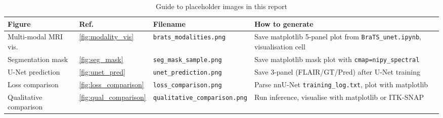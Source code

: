 \documentclass[12pt,a4paper]{report}
\begin{document}
\begin{table}[H]
\centering
\caption{Guide to placeholder images in this report}
\label{tab:image_guide}
\begin{tabular}{lllp{5cm}}
\toprule
\textbf{Figure} & \textbf{Ref.} & \textbf{Filename} & \textbf{How to generate} \\
\midrule
Multi-modal MRI vis. & \ref{fig:modality_vis} & \texttt{brats\_modalities.png} & Save matplotlib 5-panel plot from \texttt{BraTS\_unet.ipynb}, visualisation cell \\
Segmentation mask & \ref{fig:seg_mask} & \texttt{seg\_mask\_sample.png} & Save matplotlib mask plot with \texttt{cmap=nipy\_spectral} \\
U-Net prediction & \ref{fig:unet_pred} & \texttt{unet\_prediction.png} & Save 3-panel (FLAIR/GT/Pred) after U-Net training \\
Loss comparison & \ref{fig:loss_comparison} & \texttt{loss\_comparison.png} & Parse nnU-Net \texttt{training\_log.txt}, plot with matplotlib \\
Qualitative comparison & \ref{fig:qual_comparison} & \texttt{qualitative\_comparison.png} & Run inference, visualise with matplotlib or ITK-SNAP \\
\bottomrule
\end{tabular}
\end{table}
\end{document}
